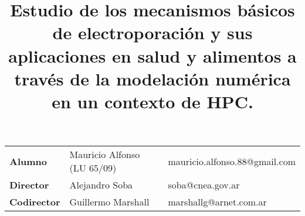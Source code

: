 \documentclass[a4paper,spanish]{article}
\title{Estudio de los mecanismos básicos de electroporación y sus aplicaciones en salud y alimentos a través de la modelación numérica en un contexto de HPC.}
\author{}
\date{}
\begin{document}
\newcommand{\h}{\ce{H^+}}
\newcommand{\oh}{\ce{OH^-}}
\newcommand{\na}{\ce{Na^+}}
\newcommand{\cl}{\ce{Cl^-}}
\newcommand{\kvm}{$\si{\kilo\volt\per\metre}$}
\newcommand{\usec}{$\si{\micro\second}$}

\maketitle

\begin{table}[h!] \begin{center}
	\begin{tabular}{l  l  l}
				
		\textbf{Alumno} & Mauricio Alfonso (LU 65/09) & mauricio.alfonso.88@gmail.com\\
		\textbf{Director} & Alejandro Soba & soba@cnea.gov.ar\\
		\textbf{Codirector} & Guillermo Marshall & marshallg@arnet.com.ar\\
		
	\end{tabular}
	\end{center}
\end{table}
\end{document}
